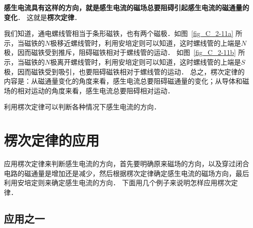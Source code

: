 \textbf{感生电流具有这样的方向，就是感生电流的磁场总要阻碍引起感生电流的磁通量的变化}．
这就是\textbf{楞次定律}．

我们知道，通电螺线管相当于条形磁铁，也有两个磁极．如图~\ref{fig_C_2-11a} 所示，当磁铁的$N$极移近螺线管时，利用安培定则可以知道，这时螺线管的上端是$N$极，因而磁铁受到推斥，阻碍磁铁相对于螺线管的运动．
如图~\ref{fig_C_2-11b} 所示，当磁铁的$N$极离开螺线管时，利用安培定则可以知道，这时螺线管的上端是$S$极，因而磁铁受到吸引，也要阻碍磁铁相对于螺线管的运动．
总之，楞次定律的内容是：从磁通量变化的角度来看，感生电流总要阻碍磁通量的变化；从导体和磁场的相对运动的角度来看，感生电流总要阻碍相对运动．

利用楞次定律可以判断各种情况下感生电流的方向．

\section{楞次定律的应用}
应用楞次定律来判断感生电流的方向，首先要明确原来磁场的方向，以及穿过闭合电路的磁通量是增加还是减少，然后根据楞次定律确定感生电流的磁场方向，最后利用安培定则来确定感生电流的方向．
下面用几个例子来说明怎样应用楞次定律．

\subsection*{应用之一}



